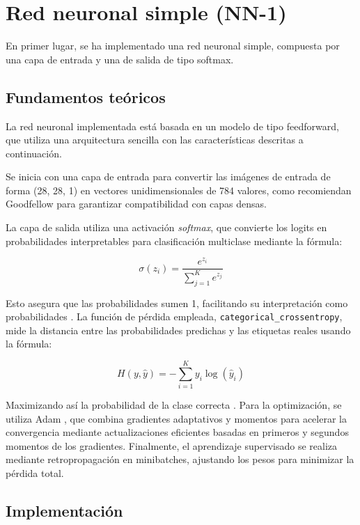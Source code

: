 \section{Red neuronal simple (NN-1)}

En primer lugar, se ha implementado una red neuronal simple, compuesta por una capa de entrada y una de salida de tipo softmax.

\subsection{Fundamentos teóricos}

La red neuronal implementada está basada en un modelo de tipo feedforward, que utiliza una arquitectura sencilla con las características descritas a continuación.

Se inicia con una capa de entrada para convertir las imágenes de entrada de forma (28, 28, 1) en vectores unidimensionales de 784 valores, como recomiendan Goodfellow \parencite{goodfellow2016deep} para garantizar compatibilidad con capas densas.

La capa de salida utiliza una activación \textit{softmax}, que convierte los logits en probabilidades interpretables para clasificación multiclase mediante la fórmula:

\[
\sigma(z_i) = \frac{e^{z_i}}{\sum_{j=1}^{K} e^{z_j}}
\]

Esto asegura que las probabilidades sumen 1, facilitando su interpretación como probabilidades \parencite{bishop2006pattern}. La función de pérdida empleada, \texttt{categorical\_crossentropy}, mide la distancia entre las probabilidades predichas y las etiquetas reales usando la fórmula:

\[
H(y, \hat{y}) = -\sum_{i=1}^{K} y_i \log(\hat{y}_i)
\]

Maximizando así la probabilidad de la clase correcta \parencite{murphy2012machine}. Para la optimización, se utiliza Adam \parencite{kingma2014adam}, que combina gradientes adaptativos y momentos para acelerar la convergencia mediante actualizaciones eficientes basadas en primeros y segundos momentos de los gradientes. Finalmente, el aprendizaje supervisado se realiza mediante retropropagación \parencite{rumelhart1986learning} en minibatches, ajustando los pesos para minimizar la pérdida total.


\subsection{Implementación}

